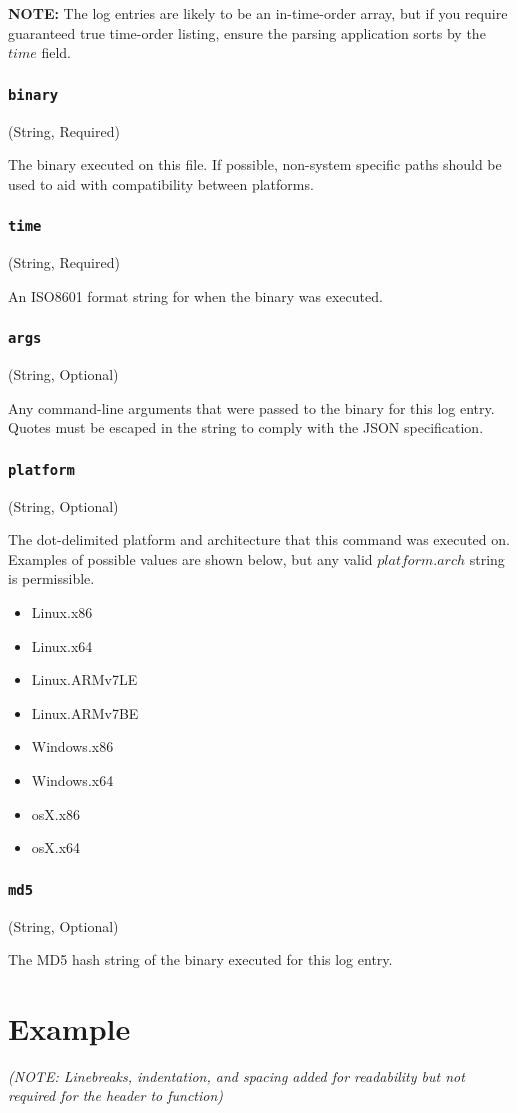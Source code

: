 \textbf{NOTE:} The log entries are likely to be an in-time-order array, but if you require guaranteed true time-order listing, ensure the parsing application sorts by the $time$ field.

\subsubsection{\texttt{binary}}
(String, Required)

The binary executed on this file.
If possible, non-system specific paths should be used to aid with compatibility between platforms.

\subsubsection{\texttt{time}}
(String, Required)

An ISO8601\cite{ISO/8601} format string for when the binary was executed.

\subsubsection{\texttt{args}}
(String, Optional)

Any command-line arguments that were passed to the binary for this log entry.
Quotes must be escaped in the string to comply with the JSON specification.

\subsubsection{\texttt{platform}}
(String, Optional)

The dot-delimited platform and architecture that this command was executed on.
Examples of possible values are shown below, but any valid $platform.arch$ string is permissible.

\begin{itemize}
    \item{Linux.x86}
    \item{Linux.x64}
    \item{Linux.ARMv7LE}
    \item{Linux.ARMv7BE}
    \item{Windows.x86}
    \item{Windows.x64}
    \item{osX.x86}
    \item{osX.x64}
\end{itemize}


\subsubsection{\texttt{md5}}
(String, Optional)

The MD5 hash string of the binary executed for this log entry.


\section{Example}



\noindent\textit{(NOTE: Linebreaks, indentation, and spacing added for readability but not required for the header to function)}